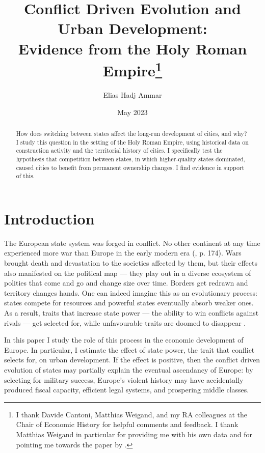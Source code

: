 \documentclass[11pt, a4paper]{article}
\title{Conflict Driven Evolution and Urban Development: \\ Evidence from the Holy Roman Empire\footnote{
I thank Davide Cantoni, Matthias Weigand, and my RA colleagues at the Chair of Economic History for helpful comments and feedback. I thank Matthias Weigand in particular for providing me with his own data and for pointing me towards the paper by \cite{schoenholzer2022}.
}
}
\author{Elias Hadj Ammar}
\date{May 2023}
\begin{document}
\onehalfspacing
\maketitle
\thispagestyle{empty}

\begin{abstract}
How does switching between states affect the long-run development of cities, and why? I study this question in the setting of the Holy Roman Empire, using historical data on construction activity and the territorial history of cities. I specifically test the hypothesis that competition between states, in which higher-quality states dominated, caused cities to benefit from permanent ownership changes. I find evidence in support of this.
\end{abstract}

\newpage

\setcounter{page}{1}
\doublespacing



\section{Introduction}



The European state system was forged in conflict. No other continent at any time experienced more war than Europe in the early modern era (\citealp{voigtlnder2013}, p. 174). Wars brought death and devastation to the societies affected by them, but their effects also manifested on the political map --- they play out in a diverse ecosystem of polities that come and go and change size over time. Borders get redrawn and territory changes hands. One can indeed imagine this as an evolutionary process: states compete for resources and powerful states eventually absorb weaker ones. As a result, traits that increase state power --- the ability to win conflicts against rivals --- get selected for, while unfavourable traits are doomed to disappear \citep{levine2021}.

In this paper I study the role of this process in the economic development of Europe. In particular, I estimate the effect of state power, the trait that conflict selects for, on urban development. If the effect is positive, then the conflict driven evolution of states may partially explain the eventual ascendancy of Europe: by selecting for military success, Europe's violent history may have accidentally produced fiscal capacity, efficient legal systems, and prospering middle classes.
\end{document}
